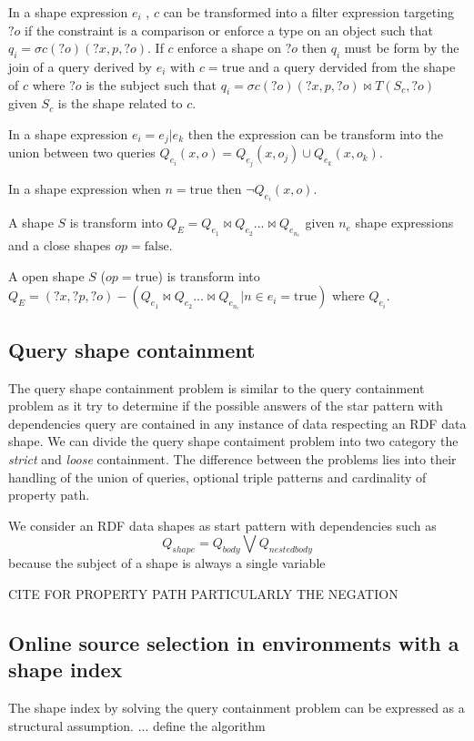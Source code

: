 \begin{prop}
   In a shape expression $e_i$ , $c$ can be transformed into a filter expression targeting $?o$ if the constraint is a comparison or enforce a type on an object such that
   $q_{i} = \sigma{c(?o)}(?x, p, ?o)$. 
   If $c$ enforce a shape on $?o$ then $q_i$ must be form by the join of a query derived by $e_i$ with $c = \mathrm{true}$ and a query dervided from the shape of $c$ where $?o$ is the subject 
   such that $q_{i}= \sigma{c(?o)}(?x, p, ?o) \bowtie T(S_c,?o)$ given $S_c$ is the shape related to $c$.
\end{prop}

\begin{prop}
   In a shape expression $e_i = e_j|e_k$ then the expression can be transform into the union between two queries
   $Q_{e_i}(x,o)= Q_{e_j}(x,o_j) \cup Q_{e_k}(x,o_k)$.
\end{prop}

\begin{prop}
   In a shape expression when $n= \mathrm{true}$ then $\neg Q_{e_i}(x,o)$.
\end{prop}

\begin{prop}
   A shape $S$ is transform into $Q_{E} = Q_{e_1} \bowtie Q_{e_2} ... \bowtie Q_{e_{n_e}}$ given $n_e$ shape expressions and a close shapes $op = \mathrm{false}$.
\end{prop}

\begin{prop}
   A open shape $S$ ($op = \mathrm{true}$) is transform into $Q_{E} = (?x, ?p, ?o) -  (Q_{e_1} \bowtie Q_{e_2} ... \bowtie Q_{e_{n_e}}| n\in e_i = \mathrm{true}) $ where $Q_{e_i}$.
\end{prop}

\subsection{Query shape containment}
The query shape containment problem is similar to the query containment problem as it 
try to determine if the possible answers of the star pattern with dependencies query are contained in any instance of data respecting an RDF data shape.
We can divide the query shape contaiment problem into two category the \emph{strict} and \emph{loose} containment.
The difference between the problems lies into their handling of the union of queries, optional triple patterns and cardinality of property path.


We consider an RDF data shapes as start pattern with dependencies such as 
\begin{equation}
   Q_{shape} = Q_{body} \bigvee Q_{nested body}
\end{equation}
because the subject of a shape is always a single variable 

CITE FOR PROPERTY PATH PARTICULARLY THE NEGATION \cite{Kostylev2015}



\subsection{Online source selection in environments with a shape index}

The shape index by solving the query containment problem can be expressed as a structural assumption.
... define the algorithm